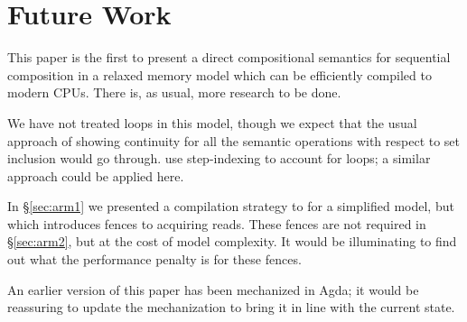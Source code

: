 \section{Future Work}

This paper is the first to present a direct compositional semantics for
sequential composition in a relaxed memory model which can be
efficiently compiled to modern CPUs. There is, as usual, more research
to be done.

We have not treated loops in this model, though we expect that the usual
approach of showing continuity for all the semantic operations with respect to set inclusion
would go through. \citet{DBLP:conf/esop/PaviottiCPWOB20} use step-indexing to account for
loops; a similar approach could be applied here.

In \S\ref{sec:arm1} we presented a compilation strategy to \armeight{}
for a simplified model, but which introduces fences to acquiring
reads. These fences are not required in \S\ref{sec:arm2}, but at the
cost of model complexity. It would be illuminating to find out what
the performance penalty is for these fences.

An earlier version of this paper has been mechanized in Agda; it would be
reassuring to update the mechanization to bring it in line with the current state.




